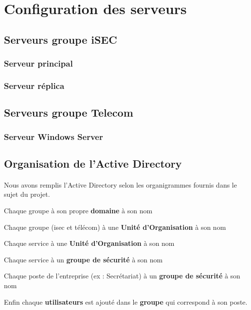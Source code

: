 \section{Configuration des serveurs}
	\subsection{Serveurs groupe iSEC}	
		\subsubsection{Serveur principal}
		\subsubsection{Serveur réplica}

	\subsection{Serveurs groupe Telecom}
		\subsubsection{Serveur Windows Server}


	\subsection{Organisation de l'Active Directory}	
		\paragraph{}
			Nous avons remplis l'Active Directory selon les organigrammes fournis dans le sujet du projet. 

		\begin{description}
			\item Chaque groupe à son propre \textbf{domaine} à son nom
			\item Chaque groupe (isec et télécom) à une \textbf{Unité d'Organisation} à son nom
			\item Chaque service à une \textbf{Unité d'Organisation} à son nom
			\item Chaque service à un \textbf{groupe de sécurité} à son nom 
			\item Chaque poste de l'entreprise (ex : Secrétariat) à un \textbf{groupe de sécurité} à son nom
			\item Enfin chaque \textbf{utilisateurs} est ajouté dans le \textbf{groupe} qui correspond à son poste. 
		\end{description}

